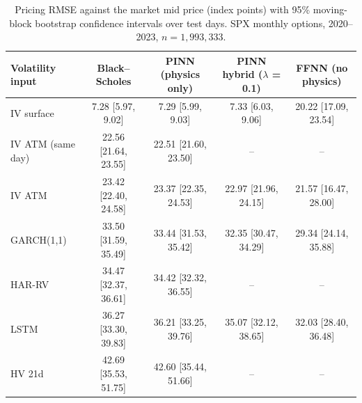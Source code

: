 \begin{table}[t]
\centering
\small
\caption{Pricing RMSE against the market mid price (index points) with 95\% moving-block bootstrap confidence intervals over test days. SPX monthly options, 2020--2023, $n = 1{,}993{,}333$.}
\label{tab:main-results}
\begin{tabular}{lcccc}
\toprule
Volatility input & Black--Scholes & PINN (physics only) & PINN hybrid ($\lambda$ = 0.1) & FFNN (no physics) \\
\midrule
IV surface & 7.28 [5.97, 9.02] & 7.29 [5.99, 9.03] & 7.33 [6.03, 9.06] & 20.22 [17.09, 23.54] \\
IV ATM (same day) & 22.56 [21.64, 23.55] & 22.51 [21.60, 23.50] & -- & -- \\
IV ATM & 23.42 [22.40, 24.58] & 23.37 [22.35, 24.53] & 22.97 [21.96, 24.15] & 21.57 [16.47, 28.00] \\
GARCH(1,1) & 33.50 [31.59, 35.49] & 33.44 [31.53, 35.42] & 32.35 [30.47, 34.29] & 29.34 [24.14, 35.88] \\
HAR-RV & 34.47 [32.37, 36.61] & 34.42 [32.32, 36.55] & -- & -- \\
LSTM & 36.27 [33.30, 39.83] & 36.21 [33.25, 39.76] & 35.07 [32.12, 38.65] & 32.03 [28.40, 36.48] \\
HV 21d & 42.69 [35.53, 51.75] & 42.60 [35.44, 51.66] & -- & -- \\
\bottomrule
\end{tabular}
\end{table}